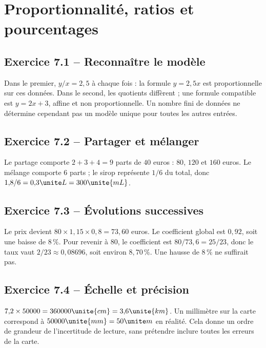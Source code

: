 \chapter{Proportionnalité, ratios et pourcentages}
\label{corriges:07}
\section*{Exercice 7.1 -- Reconnaître le modèle}
Dans le premier, $y/x=2{,}5$ à chaque fois : la formule $y=2{,}5x$ est proportionnelle sur ces données. Dans le second, les quotients diffèrent ; une formule compatible est $y=2x+3$, affine et non proportionnelle. Un nombre fini de données ne détermine cependant pas un modèle unique pour toutes les autres entrées.

\section*{Exercice 7.2 -- Partager et mélanger}
Le partage comporte $2+3+4=9$ parts de $40$ euros : $80$, $120$ et $160$ euros.
Le mélange comporte $6$ parts ; le sirop représente $1/6$ du total, donc $1{,}8/6=0{,}3\unite L=300\unite{mL}$.

\section*{Exercice 7.3 -- Évolutions successives}
Le prix devient $80\times1{,}15\times0{,}8=73{,}60$ euros. Le coefficient global est $0{,}92$, soit une baisse de $8\,\%$. Pour revenir à $80$, le coefficient est $80/73{,}6=25/23$, donc le taux vaut $2/23\approx0{,}08696$, soit environ $8{,}70\,\%$. Une hausse de $8\,\%$ ne suffirait pas.

\section*{Exercice 7.4 -- Échelle et précision}
$7{,}2\times50000=360000\unite{cm}=3{,}6\unite{km}$. Un millimètre sur la carte correspond à $50000\unite{mm}=50\unite m$ en réalité. Cela donne un ordre de grandeur de l'incertitude de lecture, sans prétendre inclure toutes les erreurs de la carte.
